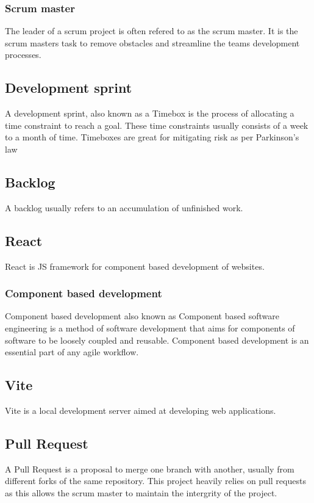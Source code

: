 \documentclass[12pt]{article}
\begin{document}
\subsubsection{Scrum master}
The leader of a scrum project is often refered to as the scrum master.
It is the scrum masters task to remove obstacles and streamline the teams development processes.
\subsection{Development sprint\cite{Timeboxing2024}}
A development sprint, also known as a Timebox is the process of allocating a time constraint to
reach a goal. These time constraints usually consists of a week to a month of time.
Timeboxes are great for mitigating risk as per Parkinson's law\cite{ParkinsonLaw2024}
\subsection{Backlog\cite{Backlog2022}}
A backlog usually refers to an accumulation of unfinished work.
\subsection{React\cite{React}}
React is JS\cite{ECMA262} framework for component based development of websites.
\subsubsection{Component based development\cite*{ComponentbasedSoftwareEngineering2024}}
Component based development also known as Component based software engineering is a method of software development
that aims for components of software to be loosely coupled and reusable. Component based development is an 
essential part of any agile workflow.
\subsection{Vite\cite{Vite}}
Vite is a local development server aimed at developing web applications.
\subsection{Pull Request\cite{PullRequests}}
A Pull Request is a proposal to merge one branch with another, usually from different forks of the same repository.
This project heavily relies on pull requests as this allows the scrum master to maintain the intergrity of the project.
\end{document}
